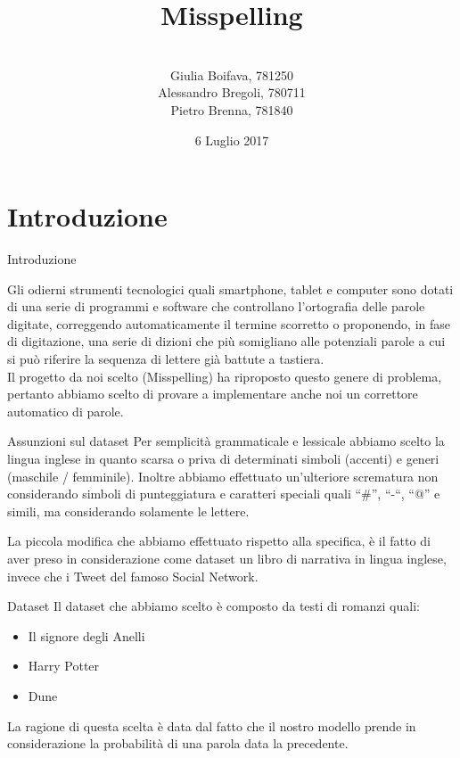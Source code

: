 \documentclass[aspectratio=169]{beamer}
\title{Misspelling}
\author[Boifava, Bregoli, Brenna]{ \\ Giulia Boifava, 781250 \\ Alessandro Bregoli, 780711 \\ Pietro Brenna, 781840}
\date{6 Luglio 2017}
\begin{document}
\begin{frame}
  \titlepage
\end{frame}

\section{Introduzione}

\begin{frame}{Introduzione}


    Gli odierni strumenti tecnologici quali smartphone, tablet e computer sono dotati di una serie di programmi e software che controllano
    l’ortografia delle parole digitate, correggendo automaticamente il termine scorretto o proponendo, in fase di digitazione, una serie di
    dizioni che più somigliano alle potenziali parole a cui si può riferire la sequenza di lettere già battute a tastiera.\\
    Il progetto da noi scelto (Misspelling) ha riproposto questo genere di problema, pertanto abbiamo scelto di provare a implementare 
    anche noi un correttore automatico di parole.

\end{frame}

\begin{frame}{Assunzioni sul dataset}
Per semplicità grammaticale e lessicale abbiamo scelto la lingua inglese in quanto scarsa o priva di determinati simboli (accenti) e generi (maschile / 
femminile).
Inoltre abbiamo effettuato un’ulteriore scrematura non considerando simboli di punteggiatura e caratteri speciali quali “\#”, “-“, “@” e simili, ma 
considerando solamente le lettere.

La piccola modifica che abbiamo effettuato rispetto alla specifica, è il fatto di aver preso in considerazione come dataset un libro di narrativa in 
lingua inglese, invece che i Tweet del famoso Social Network.
\end{frame}

\begin{frame}{Dataset}
Il dataset che abbiamo scelto è composto da testi di romanzi quali:
\begin{itemize}
 \item Il signore degli Anelli
 \item Harry Potter
 \item Dune
\end{itemize}
La ragione di questa scelta è data dal fatto che il nostro modello prende in considerazione
la probabilità di una parola data la precedente.
\end{frame}
\end{document}
